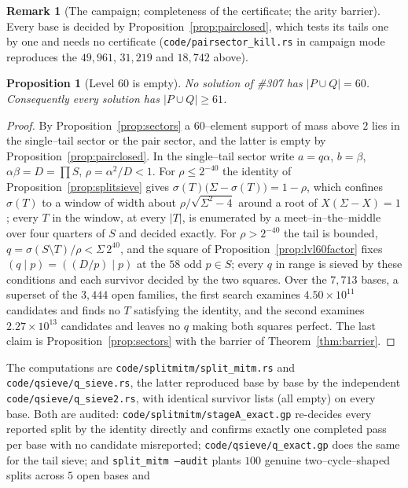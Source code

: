 \documentclass[11pt]{article}
\newtheorem{proposition}[theorem]{Proposition}
\theoremstyle{definition}
\newtheorem{remark}[theorem]{Remark}
\begin{document}
\begin{remark}[The campaign; completeness of the certificate; the arity barrier]
Every base is decided by Proposition~\ref{prop:pairclosed}, which tests its tails one by one and needs no certificate
(\texttt{code/pairsector\_kill.rs} in campaign mode reproduces the $49{,}961$, $31{,}219$ and $18{,}742$ above).
\end{remark}

\begin{proposition}[Level $60$ is empty]\label{prop:level60closed}
No solution of \#307 has $|P\cup Q|=60$. Consequently every solution has $|P\cup Q|\ge61$.
\end{proposition}
\begin{proof}
By Proposition~\ref{prop:sectors} a $60$--element support of mass above $2$ lies in the single--tail sector or the pair
sector, and the latter is empty by Proposition~\ref{prop:pairclosed}. In the single--tail sector write
$a=q\alpha$, $b=\beta$, $\alpha\beta=D=\prod S$, $\rho=\alpha^{2}/D<1$. For $\rho\le2^{-40}$ the identity of
Proposition~\ref{prop:splitsieve} gives $\sigma(T)\bigl(\Sigma-\sigma(T)\bigr)=1-\rho$, which confines $\sigma(T)$ to a window of
width about $\rho/\sqrt{\Sigma^{2}-4}$ around a root of $X(\Sigma-X)=1$; every $T$ in the window, at every $|T|$, is enumerated by
a meet--in--the--middle over four quarters of $S$ and decided exactly. For $\rho>2^{-40}$ the tail is bounded,
$q=\sigma(S\setminus T)/\rho<\Sigma\,2^{40}$, and the square of Proposition~\ref{prop:lvl60factor} fixes $(q\mid p)=((D/p)\mid p)$
at the $58$ odd $p\in S$; every $q$ in range is sieved by these conditions and each survivor decided by the two squares.
Over the $7{,}713$ bases, a superset of the $3{,}444$ open families, the first search examines $4.50\times10^{11}$
candidates and finds no $T$ satisfying the identity, and the second examines $2.27\times10^{13}$ candidates and leaves no
$q$ making both squares perfect. The last claim is Proposition~\ref{prop:sectors} with the barrier of
Theorem~\ref{thm:barrier}.
\end{proof}
The computations are \texttt{code/splitmitm/split\_mitm.rs} and \texttt{code/qsieve/q\_sieve.rs}, the latter reproduced base
by base by the independent \texttt{code/qsieve/q\_sieve2.rs}, with identical survivor lists (all empty) on every base.
Both are audited: \texttt{code/splitmitm/stageA\_exact.gp} re-decides every reported split by the identity directly and
confirms exactly one completed pass per base with no candidate misreported; \texttt{code/qsieve/q\_exact.gp} does the same
for the tail sieve; and \texttt{split\_mitm --audit} plants $100$ genuine two--cycle--shaped splits across $5$ open bases and
\end{document}
